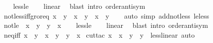 \begin{isabellebody}
%
\isadelimproof
\ \ %
\endisadelimproof
%
\isatagproof
{}\isamarkupfalse%
\ less{\isacharunderscore}{\kern0pt}le\isanewline
\ \ \isamarkupfalse%
\ linear\ \isamarkupfalse%
\ {\isacharparenleft}{\kern0pt}blast\ intro{\isacharcolon}{\kern0pt}\ order{\isachardot}{\kern0pt}antisym{\isacharparenright}{\kern0pt}%
\endisatagproof
{\isafoldproof}%
%
\isadelimproof
\isanewline
%
\endisadelimproof
\isanewline
{}\isamarkupfalse%
\ not{\isacharunderscore}{\kern0pt}less{\isacharunderscore}{\kern0pt}iff{\isacharunderscore}{\kern0pt}gr{\isacharunderscore}{\kern0pt}or{\isacharunderscore}{\kern0pt}eq{\isacharcolon}{\kern0pt}\ {\isachardoublequoteopen}{\isasymnot}{\isacharparenleft}{\kern0pt}x\ {\isacharless}{\kern0pt}\ y{\isacharparenright}{\kern0pt}\ {\isasymlongleftrightarrow}\ {\isacharparenleft}{\kern0pt}x\ {\isachargreater}{\kern0pt}\ y\ {\isasymor}\ x\ {\isacharequal}{\kern0pt}\ y{\isacharparenright}{\kern0pt}{\isachardoublequoteclose}\isanewline
%
\isadelimproof
\ \ %
\endisadelimproof
%
\isatagproof
{}\isamarkupfalse%
\ {\isacharparenleft}{\kern0pt}auto\ simp\ add{\isacharcolon}{\kern0pt}not{\isacharunderscore}{\kern0pt}less\ le{\isacharunderscore}{\kern0pt}less{\isacharparenright}{\kern0pt}%
\endisatagproof
{\isafoldproof}%
%
\isadelimproof
\isanewline
%
\endisadelimproof
\isanewline
{}\isamarkupfalse%
\ not{\isacharunderscore}{\kern0pt}le{\isacharcolon}{\kern0pt}\ {\isachardoublequoteopen}{\isasymnot}\ x\ {\isasymle}\ y\ {\isasymlongleftrightarrow}\ y\ {\isacharless}{\kern0pt}\ x{\isachardoublequoteclose}\isanewline
%
\isadelimproof
\ \ %
\endisadelimproof
%
\isatagproof
{}\isamarkupfalse%
\ less{\isacharunderscore}{\kern0pt}le\isanewline
\ \ \isamarkupfalse%
\ linear\ \isamarkupfalse%
\ {\isacharparenleft}{\kern0pt}blast\ intro{\isacharcolon}{\kern0pt}\ order{\isachardot}{\kern0pt}antisym{\isacharparenright}{\kern0pt}%
\endisatagproof
{\isafoldproof}%
%
\isadelimproof
\isanewline
%
\endisadelimproof
\isanewline
{}\isamarkupfalse%
\ neq{\isacharunderscore}{\kern0pt}iff{\isacharcolon}{\kern0pt}\ {\isachardoublequoteopen}x\ {\isasymnoteq}\ y\ {\isasymlongleftrightarrow}\ x\ {\isacharless}{\kern0pt}\ y\ {\isasymor}\ y\ {\isacharless}{\kern0pt}\ x{\isachardoublequoteclose}\isanewline
%
\isadelimproof
%
\endisadelimproof
%
\isatagproof
{}\isamarkupfalse%
\ {\isacharparenleft}{\kern0pt}cut{\isacharunderscore}{\kern0pt}tac\ x\ {\isacharequal}{\kern0pt}\ x\ \ y\ {\isacharequal}{\kern0pt}\ y\ \ less{\isacharunderscore}{\kern0pt}linear{\isacharcomma}{\kern0pt}\ auto{\isacharparenright}{\kern0pt}%

\end{isabellebody}
